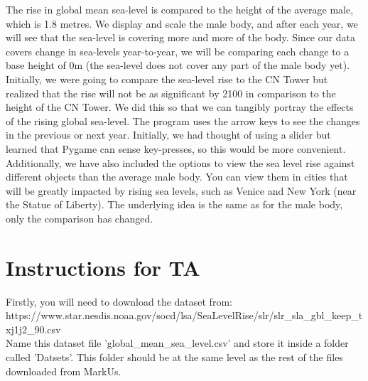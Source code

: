 \documentclass[fontsize=11pt]{article}
\begin{document}
The rise in global mean sea-level is compared to the height of the average male, which is 1.8 metres. We display and scale the male body, and after each year, we will see that the sea-level is covering more and more of the body. Since our data covers change in sea-levels year-to-year, we will be comparing each change to a base height of 0m (the sea-level does not cover any part of the male body yet). Initially, we were going to compare the sea-level rise to the CN Tower but realized that the rise will not be as significant by 2100 in comparison to the height of the CN Tower. We did this so that we can tangibly portray the effects of the rising global sea-level. The program uses the arrow keys to see the changes in the previous or next year. Initially, we had thought of using a slider but learned that Pygame can sense key-presses, so this would be more convenient.\\
Additionally, we have also included the options to view the sea level rise against different objects than the average male body. You can view them in cities that will be greatly impacted by rising sea levels, such as Venice and New York (near the Statue of Liberty). The underlying idea is the same as for the male body, only the comparison has changed.

\newpage
\section*{Instructions for TA}
Firstly, you will need to download the dataset from:\\ https://www.star.nesdis.noaa.gov/socd/lsa/SeaLevelRise/slr/slr\_sla\_gbl\_keep\_txj1j2\_90.csv\\
Name this dataset file 'global\_mean\_sea\_level.csv' and store it inside a folder called 'Datsets'. This folder should be at the same level as the rest of the files downloaded from MarkUs.\\
\end{document}
